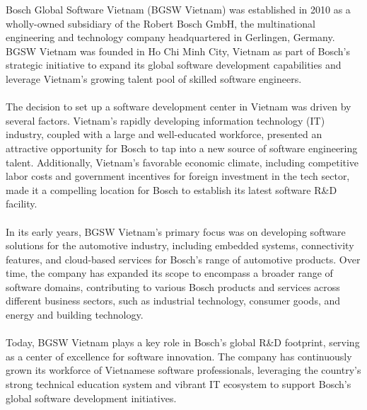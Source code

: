Bosch Global Software Vietnam (BGSW Vietnam) was established in 2010 as a wholly-owned subsidiary of the Robert Bosch GmbH, the multinational engineering and technology company headquartered in Gerlingen, Germany. BGSW Vietnam was founded in Ho Chi Minh City, Vietnam as part of Bosch's strategic initiative to expand its global software development capabilities and leverage Vietnam's growing talent pool of skilled software engineers.\cite{company_overview_about_us} \\ \\
The decision to set up a software development center in Vietnam was driven by several factors. Vietnam's rapidly developing information technology (IT) industry, coupled with a large and well-educated workforce, presented an attractive opportunity for Bosch to tap into a new source of software engineering talent. Additionally, Vietnam's favorable economic climate, including competitive labor costs and government incentives for foreign investment in the tech sector, made it a compelling location for Bosch to establish its latest software R\&D facility. \\ \\
In its early years, BGSW Vietnam's primary focus was on developing software solutions for the automotive industry, including embedded systems, connectivity features, and cloud-based services for Bosch's range of automotive products. Over time, the company has expanded its scope to encompass a broader range of software domains, contributing to various Bosch products and services across different business sectors, such as industrial technology, consumer goods, and energy and building technology. \\ \\
Today, BGSW Vietnam plays a key role in Bosch's global R\&D footprint, serving as a center of excellence for software innovation. The company has continuously grown its workforce of Vietnamese software professionals, leveraging the country's strong technical education system and vibrant IT ecosystem to support Bosch's global software development initiatives.


